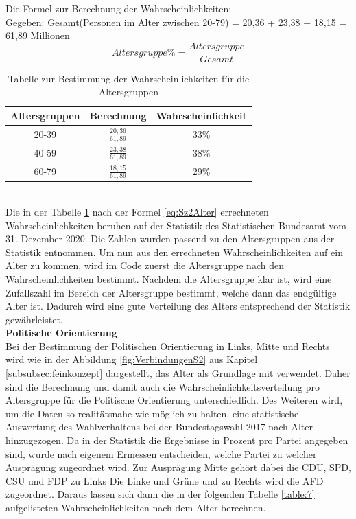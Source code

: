 \begin{onehalfspace}
Die Formel zur Berechnung der Wahrscheinlichkeiten:\\
Gegeben: Gesamt(Personen im Alter zwischen 20-79) = 20,36 + 23,38 + 18,15 = 61,89 Millionen\\
\begin{equation}
    Altersgruppe\% = \frac{Altersgruppe}{Gesamt}\label{eq:Sz2Alter}
\end{equation}
\begin{table}[!h]
    \centering
    \begin{tabular}{|c|c|c|}
    \hline
    \textbf{Altersgruppen} & \textbf{Berechnung} & \textbf{Wahrscheinlichkeit} \\ \hline
    20-39                  & \rule{0pt}{18pt} $\frac{20,36}{61,89}$ & 33\%   \\[8pt] \hline
    40-59                  & \rule{0pt}{18pt} $\frac{23,38}{61,89}$ & 38\%  \\[8pt] \hline
    60-79                  & \rule{0pt}{18pt} $\frac{18,15}{61,89}$ & 29\%   \\[8pt] \hline
    \end{tabular}
    \caption{Tabelle zur Bestimmung der Wahrscheinlichkeiten für die Altersgruppen}
    \label{table:6}
\end{table}\\
Die in der Tabelle \ref{table:6} nach der Formel \ref{eq:Sz2Alter} errechneten Wahrscheinlichkeiten beruhen auf der Statistik des Statistischen Bundesamt vom 31. Dezember 2020.\cite{statista2020} Die Zahlen wurden passend zu den Altersgruppen aus der Statistik entnommen. Um nun aus den errechneten Wahrscheinlichkeiten auf ein Alter zu kommen, wird im Code zuerst die Altersgruppe nach den Wahrscheinlichkeiten bestimmt. Nachdem die Altersgruppe klar ist, wird eine Zufallszahl im Bereich der Altersgruppe bestimmt, welche dann das endgültige Alter ist. Dadurch wird eine gute Verteilung des Alters entsprechend der Statistik gewährleistet.\\
\textbf{Politische Orientierung}\\
Bei der Bestimmung der Politischen Orientierung in Links, Mitte und Rechts wird wie in der Abbildung \ref{fig:VerbindungenS2} aus Kapitel \ref{subsubsec:feinkonzept} dargestellt, das Alter als Grundlage mit verwendet. Daher sind die Berechnung und damit auch die Wahrscheinlichkeitsverteilung pro Altersgruppe für die Politische Orientierung unterschiedlich. Des Weiteren wird, um die Daten so realitätsnahe wie möglich zu halten, eine statistische Auswertung des Wahlverhaltens bei der Bundestagswahl 2017 nach Alter hinzugezogen. Da in der Statistik die Ergebnisse in Prozent pro Partei angegeben sind, wurde nach eigenem Ermessen entscheiden, welche Partei zu welcher Ausprägung zugeordnet wird. Zur Ausprägung Mitte gehört dabei die CDU, SPD, CSU und FDP zu Links Die Linke und Grüne und zu Rechts wird die AFD zugeordnet. Daraus lassen sich dann die in der folgenden Tabelle \ref{table:7} aufgelisteten Wahrscheinlichkeiten nach dem Alter berechnen.\cite[S. 33]{konrad-adenauer-stiftung2021}\\

\end{onehalfspace}
